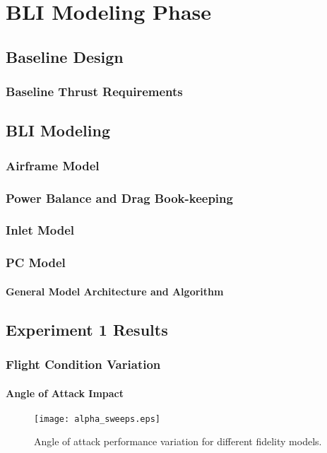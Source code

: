\chapter{BLI Modeling Phase}

\section{Baseline Design}
\subsection{Baseline Thrust Requirements}
\section{BLI Modeling}
\subsection{Airframe Model}
\subsection{Power Balance and Drag Book-keeping}
\subsection{Inlet Model}
\subsection{PC Model}
\subsubsection{General Model Architecture and Algorithm}

\section{Experiment 1 Results}

\subsection{Flight Condition Variation}

\subsubsection{Angle of Attack Impact}
	\begin{figure}[p]
	\centering
	\texttt{[image: alpha\_sweeps.eps]}
	\caption{Angle of attack performance variation for different fidelity models.}
	\label{alpha_sweeps}
	\end{figure}

